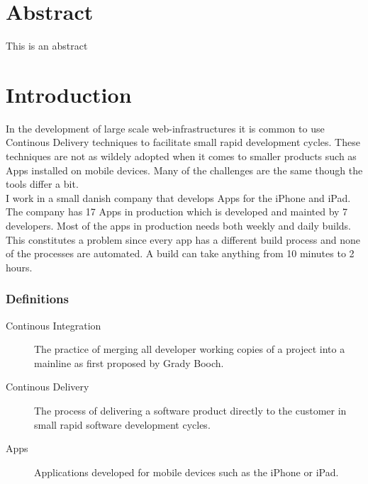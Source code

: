\documentclass{ituthesis}
\begin{document}

\frontmatter

\thetitlepage

\chapter*{Abstract}
This is an abstract

\clearpage
\setcounter{tocdepth}{1}

\mainmatter

\midsloppy
\sloppybottom

\chapter{Introduction}

In the development of large scale web-infrastructures it is common to use Continous Delivery techniques to facilitate small rapid development cycles. These techniques are not as wildely adopted when it comes to smaller products such as Apps installed on mobile devices. Many of the challenges are the same though the tools differ a bit.\\

I work in a small danish company that develops Apps for the iPhone and iPad. The company has 17 Apps in production which is developed and mainted by 7 developers. Most of the apps in production needs both weekly and daily builds. This constitutes a problem since every app has a different build process and none of the processes are automated. A build can take anything from 10 minutes to 2 hours.\cite{Humble2006}

\subsection{Definitions}

\begin{description}
\item[Continous Integration] The practice of merging all developer working copies of a project into a mainline as first proposed by Grady Booch.
\item[Continous Delivery] The process of delivering a software product directly to the customer in small rapid software development cycles.
\item[Apps] Applications developed for mobile devices such as the iPhone or iPad.
\end{description}
\end{document}

